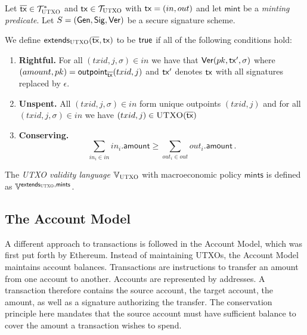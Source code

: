 \begin{definition}
  Let $\overline{\mathsf{tx}} \in \mathcal{T}_{\textsc{UTXO}}^*$ and $\mathsf{tx} \in \mathcal{T}_{\textsc{UTXO}}$ with
  $\mathsf{tx} = (in, out)$ and let $\textsf{mint}$ be a \emph{minting predicate}.
  Let $S = (\mathsf{Gen}, \mathsf{Sig}, \mathsf{Ver})$ be a secure signature scheme.

  We define $\textsf{extends}_{\textsc{UTXO}}(\overline{\mathsf{tx}}, \mathsf{tx})$ to be $\textsf{true}$
  if all of the following conditions hold:

  \begin{enumerate}
    \item \textbf{Rightful.}
          For all $(txid, j, \sigma) \in in$ we have that
          $\mathsf{Ver}(pk, \mathsf{tx}', \sigma)$ where
          $(amount, pk) = \textsf{outpoint}_{\overline{\mathsf{tx}}}(txid, j)$
          and $\mathsf{tx}'$ denotes $\mathsf{tx}$ with all signatures replaced by $\epsilon$.
    \item \textbf{Unspent.}
          All $(txid, j, \sigma) \in in$ form unique outpoints $(txid, j)$ and
          for all $(txid, j, \sigma) \in in$ we have
          $(txid, j) \in \textsc{UTXO}(\overline{\mathsf{tx}})$
    \item \textbf{Conserving.}
          \[\sum_{in_i \in in} in_i.\textsf{amount} \geq \sum_{out_i \in out} out_i.\textsf{amount}\,.\]
  \end{enumerate}

  The \emph{UTXO validity language} $\mathbb{V}_{\textsc{UTXO}}$ with macroeconomic
  policy $\textsf{mints}$ is defined as
  $\mathbb{V}^{\textsf{extends}_{\textsc{UTXO}},\textsf{mints}}$.
\end{definition}

\subsection{The Account Model}
A different approach to transactions is followed in the Account Model, which was
first put forth by Ethereum. Instead of maintaining UTXOs, the Account Model
maintains account balances. Transactions are instructions to transfer an amount
from one account to another. Accounts are represented by addresses. A
transaction therefore contains the source account, the target account, the
amount, as well as a signature authorizing the transfer. The conservation
principle here mandates that the source account must have sufficient balance to
cover the amount a transaction wishes to spend.

